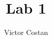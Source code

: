 \documentclass{article}
\newcommand{\PsetAuthorName}{Victor Costan}
\newcommand{\PsetTitle}{Lab 1}
\newcommand{\PsetMainFile}{6.823/lab1/all.tex}
\begin{document}
\title{\PsetClassNumber\space\PsetClassTerm\space\PsetTitle}
\author{\PsetAuthorName}
\maketitle


\end{document}
